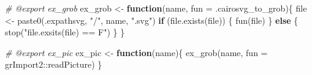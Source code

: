 \documentclass[
]{article}
\newenvironment{Shaded}{\begin{snugshade}}{\end{snugshade}}
\newcommand{\AttributeTok}[1]{\textcolor[rgb]{0.77,0.63,0.00}{#1}}
\newcommand{\CommentTok}[1]{\textcolor[rgb]{0.56,0.35,0.01}{\textit{#1}}}
\newcommand{\ControlFlowTok}[1]{\textcolor[rgb]{0.13,0.29,0.53}{\textbf{#1}}}
\newcommand{\FunctionTok}[1]{\textcolor[rgb]{0.00,0.00,0.00}{#1}}
\newcommand{\NormalTok}[1]{#1}
\newcommand{\OtherTok}[1]{\textcolor[rgb]{0.56,0.35,0.01}{#1}}
\newcommand{\SpecialCharTok}[1]{\textcolor[rgb]{0.00,0.00,0.00}{#1}}
\newcommand{\StringTok}[1]{\textcolor[rgb]{0.31,0.60,0.02}{#1}}
\begin{document}
\begin{Shaded}
\begin{Highlighting}[]
\CommentTok{\#\textquotesingle{} @export ex\_grob}
\NormalTok{ex\_grob }\OtherTok{\textless{}{-}} \ControlFlowTok{function}\NormalTok{(name, }\AttributeTok{fun =}\NormalTok{ .cairosvg\_to\_grob)\{}
\NormalTok{  file }\OtherTok{\textless{}{-}} \FunctionTok{paste0}\NormalTok{(.expathsvg, }\StringTok{"/"}\NormalTok{, name, }\StringTok{".svg"}\NormalTok{)}
  \ControlFlowTok{if}\NormalTok{ (}\FunctionTok{file.exists}\NormalTok{(file)) \{}
    \FunctionTok{fun}\NormalTok{(file)}
\NormalTok{  \} }\ControlFlowTok{else}\NormalTok{ \{}
    \FunctionTok{stop}\NormalTok{(}\StringTok{"file.exsits(file) == F"}\NormalTok{)}
\NormalTok{  \}}
\NormalTok{\}}

\CommentTok{\#\textquotesingle{} @export ex\_pic}
\NormalTok{ex\_pic }\OtherTok{\textless{}{-}} \ControlFlowTok{function}\NormalTok{(name)\{}
  \FunctionTok{ex\_grob}\NormalTok{(name, }\AttributeTok{fun =}\NormalTok{ grImport2}\SpecialCharTok{::}\NormalTok{readPicture)}
\NormalTok{\}}
\end{Highlighting}
\end{Shaded}
\end{document}
